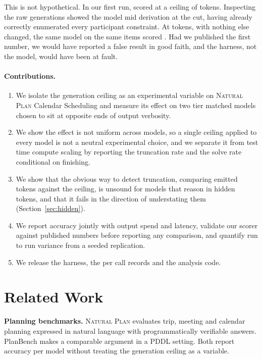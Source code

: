\documentclass[10pt,twocolumn]{article}
\begin{document}
This is not hypothetical. In our first run, \nemotronName{} scored
\nemotronLowAcc{} at a ceiling of \tokenLowBudget{} tokens. Inspecting the raw
generations showed the model mid derivation at the cut, having already correctly
enumerated every participant constraint. At \tokenHighBudget{} tokens, with
nothing else changed, the same model on the same items scored
\nemotronHighAcc{}. Had we published the first number, we would have reported a
false result in good faith, and the harness, not the model, would have been at
fault.

\paragraph{Contributions.}
\begin{enumerate}\itemsep2pt
\item We isolate the generation ceiling as an experimental variable on
      \textsc{Natural Plan} Calendar Scheduling and measure its effect on two
      tier matched models chosen to sit at opposite ends of output verbosity.
\item We show the effect is not uniform across models, so a single ceiling
      applied to every model is not a neutral experimental choice, and we
      separate it from test time compute scaling by reporting the truncation
      rate and the solve rate conditional on finishing.
\item We show that the obvious way to detect truncation, comparing emitted
      tokens against the ceiling, is unsound for models that reason in hidden
      tokens, and that it fails in the direction of understating them
      (Section~\ref{sec:hidden}).
\item We report accuracy jointly with output spend and latency, validate our
      scorer against published numbers before reporting any comparison, and
      quantify run to run variance from a seeded replication.
\item We release the harness, the per call records and the analysis code.
\end{enumerate}

\section{Related Work}

\textbf{Planning benchmarks.} \textsc{Natural Plan} \cite{zheng2024naturalplan}
evaluates trip, meeting and calendar planning expressed in natural language with
programmatically verifiable answers. PlanBench \cite{valmeekam2023planbench}
makes a comparable argument in a PDDL setting. Both report accuracy per model
without treating the generation ceiling as a variable.
\end{document}
